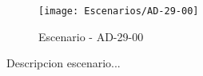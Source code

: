 \begin{figure}[H]
\centering
\texttt{[image: Escenarios/AD-29-00]}
\caption{Escenario - AD-29-00}
\label{fig:AD-29-00}
\end{figure}

Descripcion escenario...
\clearpage
